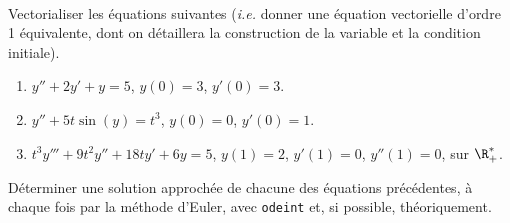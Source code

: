 \exer{[EQD-005]}
\setcounter{numques}{0}~\\

\question{}
Vectorialiser les équations suivantes (\emph{i.e.} donner une équation vectorielle d'ordre 1 équivalente, dont on détaillera la construction de la variable et la condition initiale).
  \begin{enumerate}
    \item $y'' + 2y' + y = 5$, $y(0) = 3$, $y'(0) = 3$.
    \item $y'' + 5t \sin(y) = t^3$, $y(0) = 0$, $y'(0) = 1$.
    \item $t^3y''' + 9t^2y'' + 18ty' + 6y = 5$, $y(1) = 2$, $y'(1) = 0$, $y''(1) = 0$, sur $\R_+^\ast$.  
  \end{enumerate}

\question{}
  Déterminer une solution approchée de chacune des équations précédentes, à chaque fois par la méthode d'Euler, avec \texttt{odeint} et, si possible, théoriquement.